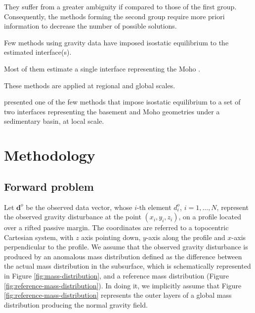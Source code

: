 \documentclass[manuscript]{geophysics}
\begin{document}
They suffer from a greater ambiguity if compared to those of the first group. 
Consequently, the methods forming the second group require more priori information to
decrease the number of possible solutions.

Few methods using gravity data have imposed isostatic equilibrium to
the estimated interface(s).

Most of them estimate a single interface representing the Moho \citep[e.g.,][]{bagherbandi-eshagh2012, sampietro2015, sjoberg2009}.

These methods are applied at regional and global scales.

\citet{salem-etal2014} presented one of the few methods that impose isostatic
equilibrium to a set of two interfaces representing the basement and Moho 
geometries under a sedimentary basin, at local scale.




\section{Methodology}


\subsection{Forward problem}


Let $\mathbf{d}^{o}$ be the observed data vector, whose $i$-th element $d^{o}_{i}$, 
$i = 1, \dots, N$, represent the observed gravity disturbance at the point 
$(x_{i}, y_{i}, z_{i})$, on a profile located over a rifted passive margin. The
coordinates are referred to a topocentric Cartesian system, with $z$ axis pointing
down, $y$-axis along the profile and $x$-axis perpendicular to the profile. 
We assume that the observed gravity disturbance is produced by an anomalous 
mass distribution defined as the difference between the actual mass distribution
in the subsurface, which is schematically represented in Figure \ref{fig:mass-distribution},
and a reference mass distribution (Figure \ref{fig:reference-mass-distribution}).
In doing it, we implicitly assume that Figure \ref{fig:reference-mass-distribution}
represents the outer layers of a global mass distribution producing the
normal gravity field. 
\end{document}
